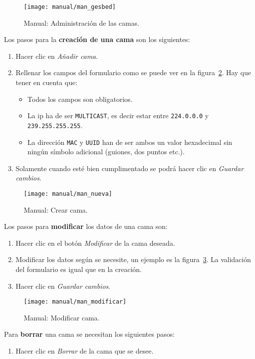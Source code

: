 \begin{figure}
	\centering
	\texttt{[image: manual/man\_gesbed]}
	\caption{Manual: Administración de las camas.}
	\label{fig:man_menu_cama}
\end{figure}

Los pasos para la \textbf{creación de una cama} son los siguientes:
\begin{enumerate}
	\item Hacer clic en \textit{Añadir cama}.
	\item Rellenar los campos del formulario como se puede ver en la figura~\ref{fig:man_new_bed}. Hay que tener en cuenta que:
	\begin{itemize}
		\item Todos los campos son obligatorios.
		\item La ip ha de ser \texttt{MULTICAST}, es decir estar entre \texttt{224.0.0.0} y \texttt{239.255.255.255}.
		\item La dirección \texttt{MAC} y \texttt{UUID} han de ser ambos un valor hexadecimal sin ningún símbolo adicional (guiones, dos puntos etc.).
	\end{itemize}
	\item Solamente cuando esté bien cumplimentado se podrá hacer clic en \textit{Guardar cambios}.
\end{enumerate}

\begin{figure}
	\centering
	\texttt{[image: manual/man\_nueva]}
	\caption{Manual: Crear cama.}
	\label{fig:man_new_bed}
\end{figure}

Los pasos para \textbf{modificar} los datos de una cama son:
\begin{enumerate}
	\item Hacer clic en el botón \textit{Modificar} de la cama deseada.
	\item Modificar los datos según se necesite, un ejemplo es la figura~\ref{fig:man_mod_bed}. La validación del formulario es igual que en la creación.
	\item Hacer clic en \textit{Guardar cambios}.
\end{enumerate}

\begin{figure}
	\centering
	\texttt{[image: manual/man\_modificar]}
	\caption{Manual: Modificar cama.}
	\label{fig:man_mod_bed}
\end{figure}

Para \textbf{borrar} una cama se necesitan los siguientes pasos:
\begin{enumerate}
	\item Hacer clic en \textit{Borrar} de la cama que se desee.
\end{enumerate}

